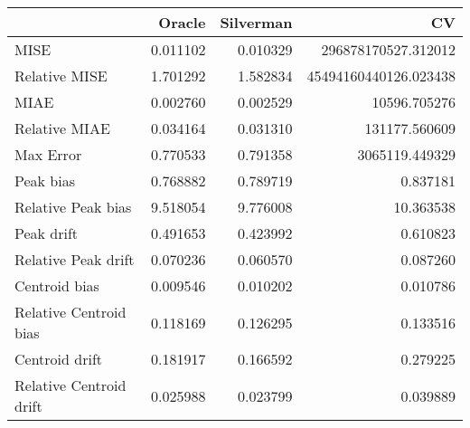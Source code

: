 \begin{tabular}{lrrr}
  \hline
 & Oracle & Silverman & CV \\ 
  \hline
MISE & 0.011102 & 0.010329 & 296878170527.312012 \\ 
  Relative MISE & 1.701292 & 1.582834 & 45494160440126.023438 \\ 
  MIAE & 0.002760 & 0.002529 & 10596.705276 \\ 
  Relative MIAE & 0.034164 & 0.031310 & 131177.560609 \\ 
  Max Error & 0.770533 & 0.791358 & 3065119.449329 \\ 
  Peak bias & 0.768882 & 0.789719 & 0.837181 \\ 
  Relative Peak bias & 9.518054 & 9.776008 & 10.363538 \\ 
  Peak drift & 0.491653 & 0.423992 & 0.610823 \\ 
  Relative Peak drift & 0.070236 & 0.060570 & 0.087260 \\ 
  Centroid bias & 0.009546 & 0.010202 & 0.010786 \\ 
  Relative Centroid bias & 0.118169 & 0.126295 & 0.133516 \\ 
  Centroid drift & 0.181917 & 0.166592 & 0.279225 \\ 
  Relative Centroid drift & 0.025988 & 0.023799 & 0.039889 \\ 
   \hline
\end{tabular}
